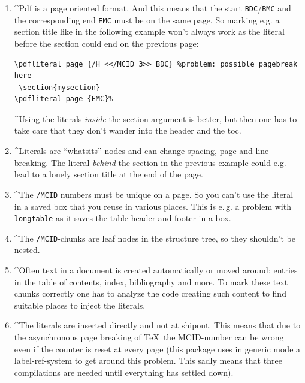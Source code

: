 \documentclass[DIV=12,parskip=half-,bibliography=totoc]{scrartcl}
\begin{document}
\begin{enumerate}[beginpenalty=10000]
  \item \TagP^Pdf is a page oriented format. And this means that the start \texttt{BDC}/\texttt{BMC}  and the corresponding end \texttt{EMC} must be on the same page.
  So marking e.g. a section title like in the following example won't always work as the literal before the section could end on the previous page:\TagPend

\begin{lstlisting}
\pdfliteral page {/H <</MCID 3>> BDC} %problem: possible pagebreak here
 \section{mysection}
\pdfliteral page {EMC}%
\end{lstlisting}
\tagmcend\tagstructend

  \TagP^Using the literals \emph{inside} the section argument is better, but then one has to take care that they don't wander into the header and the toc.\Pmeti

  \item
  \TagP^Literals are \enquote{whatsits} nodes and can change spacing, page and line breaking. The literal \emph{behind} the section in the previous example could e.g. lead to a lonely section title at the end of the page.\Pmeti

  \item
   \TagP^The \texttt{/MCID} numbers must be unique on a page. So you can't use the literal in a saved box that you reuse in various places. This is e.\,g. a problem with \texttt{longtable} as it saves the table header and footer in a box.\Pmeti

  \item
  \TagP^The  \texttt{/MCID}-chunks are leaf nodes in the structure tree, so they shouldn't be nested.\Pmeti

  \item
  \TagP^Often text in a document is created automatically or moved around: entries in the table of contents, index, bibliography and more. To mark these text chunks correctly one has to analyze the code creating such content to find suitable places to inject the literals.\Pmeti

  \item
  \TagP^The literals are inserted directly and not at shipout. This means that due to the asynchronous page breaking of \TeX\ the MCID-number can be wrong even if the counter is reset at every page (this package uses in generic mode a label-ref-system to get around this problem. This sadly means that three compilations are needed until everything has settled down).\Pmeti


\end{enumerate}
\end{document}

